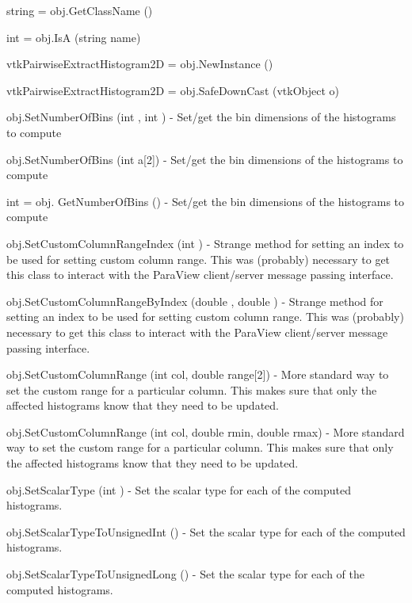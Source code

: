 \begin{DoxyItemize}
\item {\ttfamily string = obj.\-Get\-Class\-Name ()}  
\item {\ttfamily int = obj.\-Is\-A (string name)}  
\item {\ttfamily vtk\-Pairwise\-Extract\-Histogram2\-D = obj.\-New\-Instance ()}  
\item {\ttfamily vtk\-Pairwise\-Extract\-Histogram2\-D = obj.\-Safe\-Down\-Cast (vtk\-Object o)}  
\item {\ttfamily obj.\-Set\-Number\-Of\-Bins (int , int )} -\/ Set/get the bin dimensions of the histograms to compute  
\item {\ttfamily obj.\-Set\-Number\-Of\-Bins (int a\mbox{[}2\mbox{]})} -\/ Set/get the bin dimensions of the histograms to compute  
\item {\ttfamily int = obj. Get\-Number\-Of\-Bins ()} -\/ Set/get the bin dimensions of the histograms to compute  
\item {\ttfamily obj.\-Set\-Custom\-Column\-Range\-Index (int )} -\/ Strange method for setting an index to be used for setting custom column range. This was (probably) necessary to get this class to interact with the Para\-View client/server message passing interface.  
\item {\ttfamily obj.\-Set\-Custom\-Column\-Range\-By\-Index (double , double )} -\/ Strange method for setting an index to be used for setting custom column range. This was (probably) necessary to get this class to interact with the Para\-View client/server message passing interface.  
\item {\ttfamily obj.\-Set\-Custom\-Column\-Range (int col, double range\mbox{[}2\mbox{]})} -\/ More standard way to set the custom range for a particular column. This makes sure that only the affected histograms know that they need to be updated.  
\item {\ttfamily obj.\-Set\-Custom\-Column\-Range (int col, double rmin, double rmax)} -\/ More standard way to set the custom range for a particular column. This makes sure that only the affected histograms know that they need to be updated.  
\item {\ttfamily obj.\-Set\-Scalar\-Type (int )} -\/ Set the scalar type for each of the computed histograms.  
\item {\ttfamily obj.\-Set\-Scalar\-Type\-To\-Unsigned\-Int ()} -\/ Set the scalar type for each of the computed histograms.  
\item {\ttfamily obj.\-Set\-Scalar\-Type\-To\-Unsigned\-Long ()} -\/ Set the scalar type for each of the computed histograms.  

\end{DoxyItemize}
